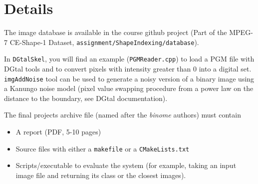 \documentclass[a4paper, 11pt]{article}
\begin{document}
\section*{Details}

The image database is available in the course github project (Part of the
MPEG-7 CE-Shape-1 Dataset, \texttt{assignment/ShapeIndexing/database}).


In \texttt{DGtalSkel}, you will find an example
(\texttt{PGMReader.cpp}) to load a PGM file with DGtal tools and to
convert pixels with intensity greater than 0 into a digital set.
\texttt{imgAddNoise} tool can be used to generate a noisy version of a
binary image using a Kanungo noise model (pixel value swapping
procedure from a power law on the distance to the boundary, see DGtal documentation).
\vspace{1cm}

\noindent The final projects archive file (named after the \emph{binome}
authors) must contain
\begin{itemize}
\item A report (PDF, 5-10 pages)
\item Source files with either a \texttt{makefile} or a
  \texttt{CMakeLists.txt}
\item Scripts/executable to evaluate the system (for example, taking
  an input image file and returning its class or the closest images).
\end{itemize}
\end{document}
